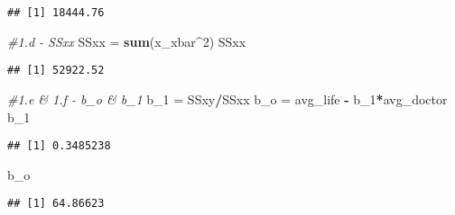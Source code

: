 \documentclass[
]{article}
\newenvironment{Shaded}{\begin{snugshade}}{\end{snugshade}}
\newcommand{\CommentTok}[1]{\textcolor[rgb]{0.56,0.35,0.01}{\textit{#1}}}
\newcommand{\DecValTok}[1]{\textcolor[rgb]{0.00,0.00,0.81}{#1}}
\newcommand{\FunctionTok}[1]{\textcolor[rgb]{0.13,0.29,0.53}{\textbf{#1}}}
\newcommand{\NormalTok}[1]{#1}
\newcommand{\OtherTok}[1]{\textcolor[rgb]{0.56,0.35,0.01}{#1}}
\newcommand{\SpecialCharTok}[1]{\textcolor[rgb]{0.81,0.36,0.00}{\textbf{#1}}}
\begin{document}
\begin{verbatim}
## [1] 18444.76
\end{verbatim}

\begin{Shaded}
\begin{Highlighting}[]
\CommentTok{\#1.d {-} SSxx}
\NormalTok{SSxx }\OtherTok{=} \FunctionTok{sum}\NormalTok{(x\_xbar}\SpecialCharTok{\^{}}\DecValTok{2}\NormalTok{)}
\NormalTok{SSxx}
\end{Highlighting}
\end{Shaded}

\begin{verbatim}
## [1] 52922.52
\end{verbatim}

\begin{Shaded}
\begin{Highlighting}[]
\CommentTok{\#1.e \& 1.f {-} b\_o \& b\_1}
\NormalTok{b\_1 }\OtherTok{=}\NormalTok{ SSxy}\SpecialCharTok{/}\NormalTok{SSxx}
\NormalTok{b\_o }\OtherTok{=}\NormalTok{ avg\_life }\SpecialCharTok{{-}}\NormalTok{ b\_1}\SpecialCharTok{*}\NormalTok{avg\_doctor}
\NormalTok{b\_1}
\end{Highlighting}
\end{Shaded}

\begin{verbatim}
## [1] 0.3485238
\end{verbatim}

\begin{Shaded}
\begin{Highlighting}[]
\NormalTok{b\_o}
\end{Highlighting}
\end{Shaded}

\begin{verbatim}
## [1] 64.86623
\end{verbatim}
\end{document}
